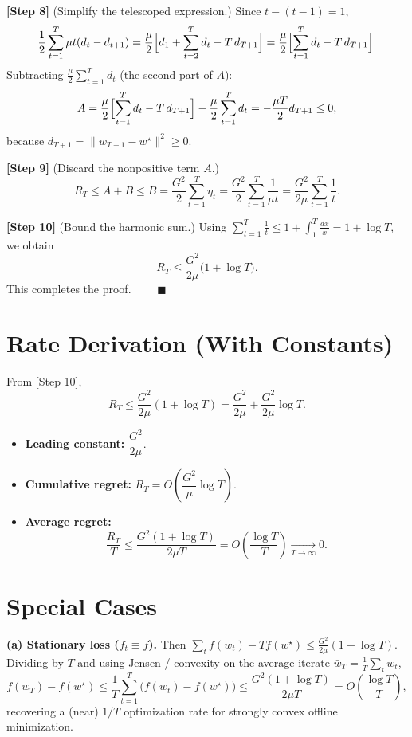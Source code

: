 \documentclass[11pt]{article}
\begin{document}
\noindent\textbf{[Step 8]} (Simplify the telescoped expression.)
Since $t-(t-1)=1$,
\[
\frac{1}{2}\sum_{t=1}^T \mu t (d_t - d_{t+1})
= \frac{\mu}{2}\Bigl[ d_1 + \sum_{t=2}^{T} d_t - T\,d_{T+1} \Bigr]
= \frac{\mu}{2}\Bigl[ \sum_{t=1}^{T} d_t - T\,d_{T+1} \Bigr].
\]
Subtracting $\frac{\mu}{2}\sum_{t=1}^T d_t$ (the second part of $A$):
\[
A = \frac{\mu}{2}\Bigl[ \sum_{t=1}^{T} d_t - T\,d_{T+1} \Bigr] - \frac{\mu}{2}\sum_{t=1}^T d_t
  = -\frac{\mu T}{2} d_{T+1} \le 0,
\]
because $d_{T+1} = \|w_{T+1}-w^\star\|^2 \ge 0$.

\noindent\textbf{[Step 9]} (Discard the nonpositive term $A$.)
\[
R_T \le A + B \le B = \frac{G^2}{2}\sum_{t=1}^T \eta_t = \frac{G^2}{2}\sum_{t=1}^T \frac{1}{\mu t}
= \frac{G^2}{2\mu}\sum_{t=1}^T \frac{1}{t}.
\]

\noindent\textbf{[Step 10]} (Bound the harmonic sum.)
Using $\sum_{t=1}^T \frac{1}{t} \le 1 + \int_1^T \frac{dx}{x} = 1 + \log T$, we obtain
\[
\boxed{\,R_T \le \frac{G^2}{2\mu}\bigl(1 + \log T\bigr).\,}
\]
This completes the proof. $\qquad\blacksquare$

\section*{Rate Derivation (With Constants)}

From [Step 10],
\[
R_T \le \frac{G^2}{2\mu}(1+\log T)
= \frac{G^2}{2\mu} + \frac{G^2}{2\mu}\log T .
\]
\begin{itemize}
  \item \textbf{Leading constant:} $\dfrac{G^2}{2\mu}$.
  \item \textbf{Cumulative regret:} $R_T = O\!\left(\dfrac{G^2}{\mu}\log T\right)$.
  \item \textbf{Average regret:}
        \[
        \frac{R_T}{T} \le \frac{G^2(1+\log T)}{2\mu T} = O\!\left(\frac{\log T}{T}\right) \xrightarrow[T\to\infty]{} 0.
        \]
\end{itemize}

\section*{Special Cases}

\textbf{(a) Stationary loss ($f_t \equiv f$).}
Then $\sum_t f(w_t) - T f(w^\star) \le \frac{G^2}{2\mu}(1+\log T)$. Dividing by $T$ and using
Jensen / convexity on the average iterate $\bar w_T = \frac1T\sum_t w_t$,
\[
f(\bar w_T) - f(w^\star) \le \frac{1}{T}\sum_{t=1}^T \bigl(f(w_t)-f(w^\star)\bigr)
\le \frac{G^2(1+\log T)}{2\mu T} = O\!\left(\frac{\log T}{T}\right),
\]
recovering a (near) $1/T$ optimization rate for strongly convex offline minimization.
\end{document}
